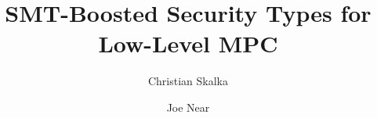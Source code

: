 
\title{SMT-Boosted Security Types for Low-Level MPC}

\author{
Christian Skalka
\and
Joe Near}


\newcommand{\theabstract}{
  \begin{abstract}
  Secure Multi-Party Computation (MPC) is an important enabling
  technology for data privacy in modern distributed applications. We
  develop a new type theory to automatically enforce correctness,
  confidentiality, and integrity properties of protocols written in
  the \emph{Prelude/Overture} language framework. Judgements in the
  type theory are predicated on SMT verifications in a theory of
  finite fields, which supports precise and efficient analysis. Our
  approach is automated, compositional, scalable, and generalizes to arbitrary
  prime fields for data and key sizes.
\end{abstract} }
